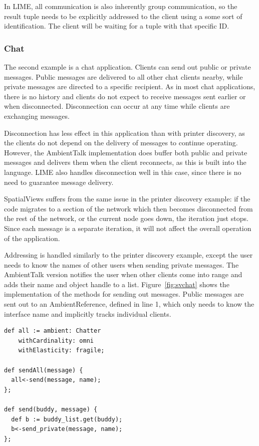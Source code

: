 In LIME, all communication is also inherently group communication, so the result tuple needs to be explicitly addressed to the client using a some sort of identification. The client will be waiting for a tuple with that specific ID.

\subsubsection{Chat}

The second example is a chat application. Clients can send out public or private messages. Public messages are delivered to all other chat clients nearby, while private messages are directed to a specific recipient. As in most chat applications, there is no history and clients do not expect to receive messages sent earlier or when disconnected. Disconnection can occur at any time while clients are exchanging messages.

Disconnection has less effect in this application than with printer discovery, as the clients do not depend on the delivery of messages to continue operating. However, the AmbientTalk implementation does buffer both public and private messages and delivers them when the client reconnects, as this is built into the language. LIME also handles disconnection well in this case, since there is no need to guarantee message delivery. 

SpatialViews suffers from the same issue in the printer discovery example: if the code migrates to a section of the network which then becomes disconnected from the rest of the network, or the current node goes down, the iteration just stops. Since each message is a separate iteration, it will not affect the overall operation of the application.

Addressing is handled similarly to the printer discovery example, except the user needs to know the names of other users when sending private messages. The AmbientTalk version notifies the user when other clients come into range and adds their name and object handle to a list. Figure~\ref{fig:svchat} shows the implementation of the methods for sending out messages. Public messages are sent out to an AmbientReference, defined in line 1, which only needs to know the interface name and implicitly tracks individual clients.

\begin{lstlisting}[caption={Chat in SpatialViews}, label={fig:svchat}]
def all := ambient: Chatter 
    withCardinality: omni 
    withElasticity: fragile;

def sendAll(message) {
  all<-send(message, name);
};

def send(buddy, message) {
  def b := buddy_list.get(buddy);
  b<-send_private(message, name);
};
\end{lstlisting}

